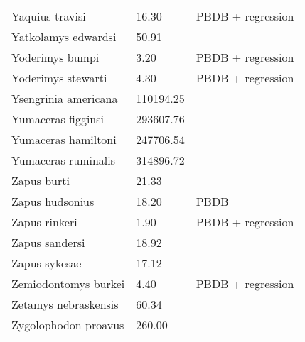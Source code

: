\begin{longtable}{p{} p{} p{}}
    Yaquius travisi & 16.30 & PBDB + regression \\ 
    Yatkolamys edwardsi & 50.91 & \cite{Tomiya2013} \\ 
    Yoderimys bumpi & 3.20 & PBDB + regression \\ 
    Yoderimys stewarti & 4.30 & PBDB + regression \\ 
    Ysengrinia americana & 110194.25 & \cite{Tomiya2013} \\ 
    Yumaceras figginsi & 293607.76 & \cite{Tomiya2013} \\ 
    Yumaceras hamiltoni & 247706.54 & \cite{Tomiya2013} \\ 
    Yumaceras ruminalis & 314896.72 & \cite{Tomiya2013} \\ 
    Zapus burti & 21.33 & \cite{Tomiya2013} \\ 
    Zapus hudsonius & 18.20 & PBDB \\ 
    Zapus rinkeri & 1.90 & PBDB + regression \\ 
    Zapus sandersi & 18.92 & \cite{Tomiya2013} \\ 
    Zapus sykesae & 17.12 & \cite{Tomiya2013} \\ 
    Zemiodontomys burkei & 4.40 & PBDB + regression \\ 
    Zetamys nebraskensis & 60.34 & \cite{Tomiya2013} \\ 
    Zygolophodon proavus & 260.00 & \cite{Lofgren2011} \\ 
  \end{longtable}

